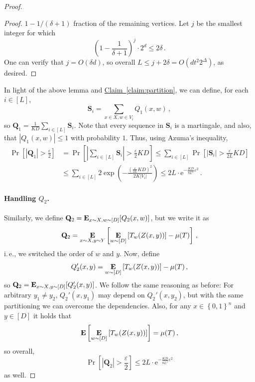 \documentclass[11pt]{article}
\numberwithin{equation}{section}
\theoremstyle{definition}
\theoremstyle{plain}
\newcommand{\eee}{\mathrm e}
\newcommand{\ie}{i.\,e.}
\newcommand{\expref}[2]{\hyperref[#2]{#1~\ref{#2}}}
\newcommand{\eps}{\varepsilon}
\newcommand{\set}[1]{\left\{{#1}\right\}}
\newcommand{\B}{\set{0,1}}
\newcommand{\E}{\mathop{\bf E\/}}
\begin{document}
\begin{proof}
\begin{proof}
%
%
$1-1/(\delta+1)$
%
fraction of the remaining vertices.
Let $j$ be the smallest integer for which
\[
\left(1 - \frac{1}{\delta+1} \right)^{j} \cdot 2^{d} \le 2\delta\,.
\]
One can verify that $j = O(\delta d)$, so overall $L \le j+2\delta = O\left(dt^{2}2^{\Delta} \right)$, as desired.
\end{proof}
In light of the above lemma and \expref{Claim}{claim:partition}, we can define, for each $i \in [L]$, 
\[\mathbf{S}_i = \sum_{x\in X,w \in V_i}Q_{1}(x,w)\,,\]
so $\mathbf{Q}_1 = \frac{1}{KD}\sum_{i \in [L]}\mathbf{S}_i$. Note that every sequence in
$\mathbf{S}_i$ is a martingale, and also, that $|Q_{1}(x,w)| \le 1$ with probability $1$. Thus,
using Azuma's inequality,
\begin{align}\label{eq:non-explicit1}
\Pr\left[\left|\mathbf{Q}_1\right| > \frac{\eps}{2}\right] &= \Pr\left[ \left|\sum_{i \in [L]}\mathbf{S}_i\right| > \frac{\eps}{2}KD \right] \le \sum_{i \in [L]}\Pr\left[\left|\mathbf{S}_i\right| > \frac{\eps}{2L}KD\right] \nonumber \\
&\le \sum_{i \in [L]} 2\exp\left( -\frac{\left(\frac{\eps}{2L}KD\right)^2}{2K|V_i|} \right) \le 
2L \cdot \eee^{-\frac{KD}{8L^2}\eps^2}\,.
\end{align}

\paragraph*{Handling $Q_2$.} Similarly, we define
$\mathbf{Q}_2 = \E_{x \sim X,w \sim [D]}[Q_{2}(x,w)]$, but we write it
as 
\[
\mathbf{Q}_2 = \E_{x \sim X,y \sim Y}\left[\E_{w \sim [D]}\left[ T_{w}(Z(x,y)) \right] - \mu(T)\right]\,,
\]
\ie, we switched the order of $w$ and $y$. Now, define
\[
Q_{2}'(x,y) = \E_{w \sim [D]}\left[ T_{w}(Z(x,y)) \right] - \mu(T)\,,
\]
so $\mathbf{Q}_2 = \E_{x \sim X,y \sim [D]}[Q'_{2}(x,y)]$. We follow the same reasoning as before:
For arbitrary $y_1 \neq y_2$, $Q_{2}'(x,y_1)$ may depend on $Q_{2}'(x,y_2)$, but with the same
partitioning we can overcome the dependencies. Also, for any $x \in \B^n$ and $y \in [D]$ 
it holds that
\[
\E\left[ \E_{w \sim [D]}\left[ T_{w}(Z(x,y)) \right] \right] = \mu(T)\,,
\]
so overall,
\begin{equation}\label{eq:non-explicit2}
\Pr\left[\left|\mathbf{Q}_2\right| > \frac{\eps}{2}\right] \le 2L \cdot \eee^{-\frac{KD}{8L^2}\eps^2}
\end{equation}
as well.

%

\end{proof}
\end{document}
